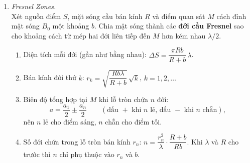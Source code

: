 \begin{enumerate}
\item \textit{Fresnel Zones.}\\
Xét nguồn điểm $S$, mặt sóng cầu bán kính $R$ và điểm quan sát $M$ cách đỉnh mặt sóng $B_0$ một khoảng $b$. Chia mặt sóng thành các \textbf{đới cầu Fresnel} sao cho khoảng cách từ mép hai đới liên tiếp đến $M$ hơn kém nhau $\lambda/2$.
\begin{figure}[htbp]
    \centering
\end{figure}
\begin{enumerate}
  \item[(a)] Diện tích mỗi đới (gần như bằng nhau): $\Delta S = \dfrac{\pi R b}{R + b}\,\lambda$.
  \item[(b)] Bán kính đới thứ $k$: $r_k = \sqrt{\dfrac{Rb\lambda}{R + b}}\,\sqrt{k}$, $k = 1, 2, \dots$
  \item[(c)] Biên độ tổng hợp tại $M$ khi lỗ tròn chứa $n$ đới:
  \[
  a = \frac{a_1}{2} \pm \frac{a_n}{2} \qquad (\text{dấu } + \text{ khi } n \text{ lẻ, dấu } - \text{ khi } n \text{ chẵn}),
  \]
  nên $n$ lẻ cho điểm sáng, $n$ chẵn cho điểm tối.
  \item[(d)] Số đới chứa trong lỗ tròn bán kính $r_n$: $n = \dfrac{r_n^2}{\lambda}\cdot\dfrac{R + b}{Rb}$. Khi $\lambda$ và $R$ cho trước thì $n$ chỉ phụ thuộc vào $r_n$ và $b$.
\end{enumerate}


\end{enumerate}
